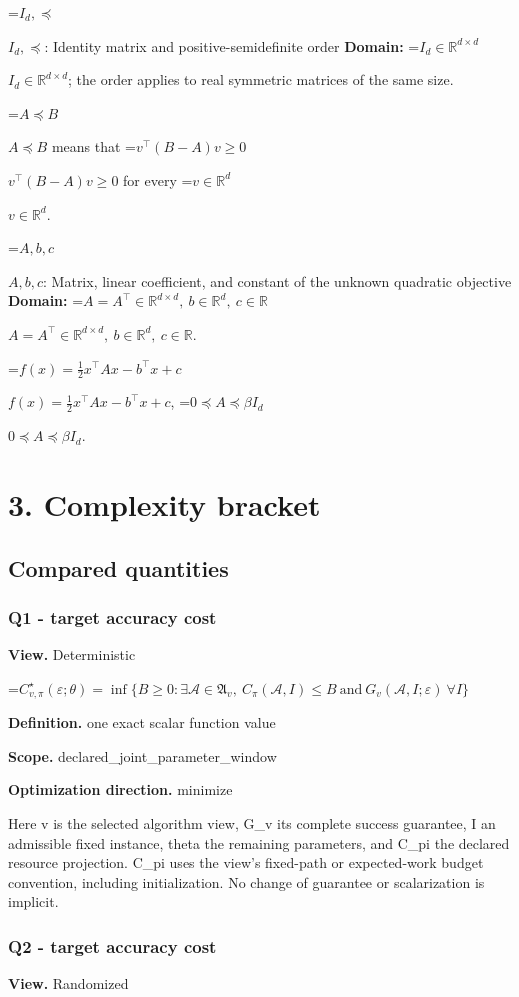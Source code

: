 \documentclass[10pt,a4paper]{article}
\newcommand{\AtlasMath}[1]{\par\begingroup\centering\setbox0=\hbox{$\displaystyle #1$}\ifdim\wd0>1.4\linewidth\typeout{ATLAS WIDE FORMULA: \the\wd0}\fi\ifdim\wd0>\linewidth\resizebox{\linewidth}{!}{\box0}\else\box0\fi\par\endgroup}
\newcommand{\AtlasInlineMath}[1]{\begingroup\setbox0=\hbox{$#1$}\ifdim\wd0>.4\linewidth\endgroup\AtlasMath{#1}\else\endgroup$#1$\fi}
\begin{document}
\AtlasInlineMath{I_d,\preceq}: Identity matrix and positive-semidefinite order \textbf{Domain:} \AtlasInlineMath{I_d\in\mathbb{R}^{d\times d}}; the order applies to real symmetric matrices of the same size.

\AtlasInlineMath{A\preceq B} means that \AtlasInlineMath{v^\top(B-A)v\ge0} for every \AtlasInlineMath{v\in\mathbb{R}^d}.

\AtlasInlineMath{A,b,c}: Matrix, linear coefficient, and constant of the unknown quadratic objective \textbf{Domain:} \AtlasInlineMath{A=A^\top\in\mathbb{R}^{d\times d},\ b\in\mathbb{R}^d,\ c\in\mathbb{R}}.

\AtlasInlineMath{f(x)=\tfrac12x^\top Ax-b^\top x+c}, \AtlasInlineMath{0\preceq A\preceq\beta I_d}.

\section{3. Complexity bracket}
\subsection{Compared quantities}
\subsubsection{Q1 - target accuracy cost}
\textbf{View.} Deterministic

\AtlasMath{C^\star_{v,\pi}(\varepsilon;\theta)=\inf\{B\ge0:\exists\mathcal A\in\mathfrak A_v,\ C_\pi(\mathcal A,I)\le B\ \text{and}\ G_v(\mathcal A,I;\varepsilon)\ \forall I\}}
\textbf{Definition.} one exact scalar function value

\textbf{Scope.} declared\_joint\_parameter\_window

\textbf{Optimization direction.} minimize

Here v is the selected algorithm view, G\_v its complete success guarantee, I an admissible fixed instance, theta the remaining parameters, and C\_pi the declared resource projection. C\_pi uses the view's fixed-path or expected-work budget convention, including initialization. No change of guarantee or scalarization is implicit.

\subsubsection{Q2 - target accuracy cost}
\textbf{View.} Randomized
\end{document}
